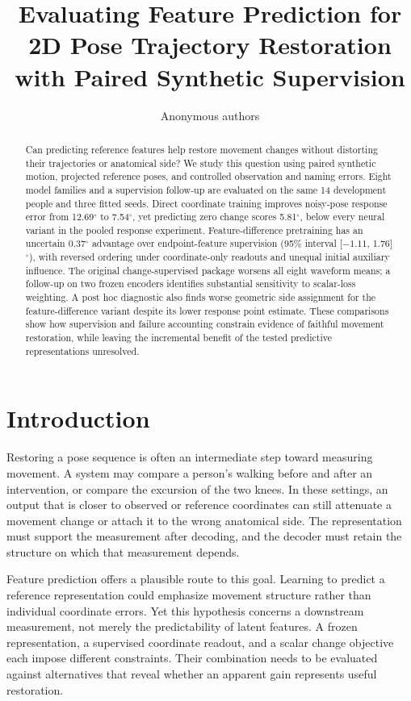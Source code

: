 \documentclass{article}
\title{Evaluating Feature Prediction for 2D Pose Trajectory Restoration with Paired Synthetic Supervision}
\author{Anonymous authors}
\newcommand{\dg}{^{\circ}}
\begin{document}
\maketitle
\begin{abstract}
Can predicting reference features help restore movement changes without distorting their trajectories or anatomical side? We study this question using paired synthetic motion, projected reference poses, and controlled observation and naming errors. Eight model families and a supervision follow-up are evaluated on the same 14 development people and three fitted seeds. Direct coordinate training improves noisy-pose response error from 12.69$\dg$ to 7.54$\dg$, yet predicting zero change scores 5.81$\dg$, below every neural variant in the pooled response experiment. Feature-difference pretraining has an uncertain 0.37$\dg$ advantage over endpoint-feature supervision (95\% interval [$-1.11$, 1.76]$\dg$), with reversed ordering under coordinate-only readouts and unequal initial auxiliary influence. The original change-supervised package worsens all eight waveform means; a follow-up on two frozen encoders identifies substantial sensitivity to scalar-loss weighting. A post hoc diagnostic also finds worse geometric side assignment for the feature-difference variant despite its lower response point estimate. These comparisons show how supervision and failure accounting constrain evidence of faithful movement restoration, while leaving the incremental benefit of the tested predictive representations unresolved.
\end{abstract}

\section{Introduction}
Restoring a pose sequence is often an intermediate step toward measuring movement. A system may compare a person's walking before and after an intervention, or compare the excursion of the two knees. In these settings, an output that is closer to observed or reference coordinates can still attenuate a movement change or attach it to the wrong anatomical side. The representation must support the measurement after decoding, and the decoder must retain the structure on which that measurement depends.

Feature prediction offers a plausible route to this goal. Learning to predict a reference representation could emphasize movement structure rather than individual coordinate errors. Yet this hypothesis concerns a downstream measurement, not merely the predictability of latent features. A frozen representation, a supervised coordinate readout, and a scalar change objective each impose different constraints. Their combination needs to be evaluated against alternatives that reveal whether an apparent gain represents useful restoration.
\end{document}
